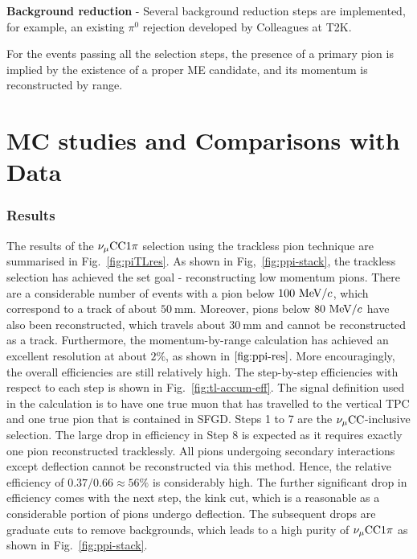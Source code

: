             \textbf{Background reduction} - Several background reduction steps are implemented, for example, an existing $\pi^0$ rejection developed by Colleagues at T2K.
        
            For the events passing all the selection steps, the presence of a primary pion is implied by the existence of a proper ME candidate, and its momentum is reconstructed by range. 
            
    
    

\section{MC studies and Comparisons with Data}
    
        \subsubsection{Results}
           The results of the $\nu_{\mu}\textrm{CC}1\pi$ selection using the trackless pion technique are summarised in Fig.~\ref{fig:piTLres}.
           As shown in Fig,~\ref{fig:ppi-stack}, the trackless selection has achieved the set goal - reconstructing low momentum pions. 
           There are a considerable number of events with a pion below $100~\textrm{MeV}/c$, which correspond to a track of about $50~\textrm{mm}$. 
           Moreover, pions below $80~\textrm{MeV}/c$ have also been reconstructed, which travels about $30~\textrm{mm}$ and cannot be reconstructed as a track. 
           Furthermore, the momentum-by-range calculation has achieved an excellent resolution at about $2\%$, as shown in $\ref{fig:ppi-res}$.
           More encouragingly, the overall efficiencies are still relatively high. 
           The step-by-step efficiencies with respect to each step is shown in Fig.~\ref{fig:tl-accum-eff}. 
           The signal definition used in the calculation is to have one true muon that has travelled to the vertical TPC and one true pion that is contained in SFGD. 
           Steps 1 to 7 are the $\nu_{\mu}\textrm{CC}$-inclusive selection. 
           The large drop in efficiency in Step 8 is expected as it requires exactly one pion reconstructed tracklessly. 
           All pions undergoing secondary interactions except deflection cannot be reconstructed via this method. 
           Hence, the relative efficiency of $0.37/0.66\approx56\%$ is considerably high. 
           The further significant drop in efficiency comes with the next step, the kink cut, which is a reasonable as a considerable portion of pions undergo deflection. 
           The subsequent drops are graduate cuts to remove backgrounds, which leads to a high purity of $\nu_{\mu}\textrm{CC}1\pi$ as shown in Fig.~\ref{fig:ppi-stack}.

